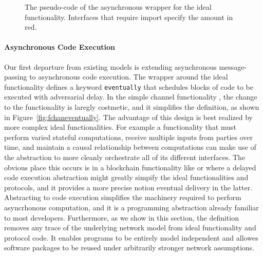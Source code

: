 
\begin{figure}

\caption{The pseudo-code of the asynchronous wrapper for the ideal functionality. Interfaces that require import specify the amount in red.}
\label{fig:wrapper}
\end{figure}

\paragraph{Asynchronous Code Execution} 
Our first departure from existing models is extending asynchronous
message-passing to asynchronous code execution.  The wrapper around the ideal
functionality defines a keyword \texttt{eventually} that schedules blocks of
code to be executed with adversarial delay.  In the simple channel
functionality \Fchan, the change to the functionality is laregly costmetic, and
it simplifies the definition, as shown in Figure~\ref{fig:fchaneventually}.
The advantage of this design is best realized by more complex ideal
functionalities.  For example a functionality that must perform varied stateful
computations, receive multiple inputs from parties over time, and maintain a
causal relationship between computations can make use of the abstraction to
more cleanly orchestrate all of its different interfaces.  The obvious place
this occurs is in a blockchain functionality like \cite{badertscher2024bitcoin}
or \cite{miller2019sprites} where a delayed code execution abstraction might
greatly simpify the ideal functionalities and protocols, and it provides a more
precise notion eventual delivery in the latter.  Abstracting to code execution
simplifies the machinery required to perform asyncrhonous computation, and it
is a programming abstraction already familiar to most developers.  Furthermore,
as we show in this section, the definition removes any trace of the underlying
network model from ideal functionality and protocol code.  It enables programs
to be entirely model independent and allowes software packages to be reused
under arbitrarily stronger network assumptions.

